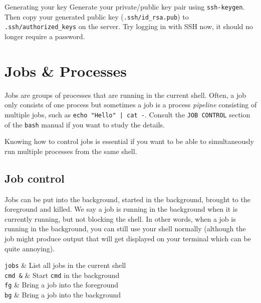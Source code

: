 \documentclass{TheAlternativeCourse}
\begin{document}
\begin{exercisebox}{Generating your key}
    Generate your private/public key pair using \texttt{ssh-keygen}.
    Then copy your generated public key (\texttt{.ssh/id\_rsa.pub}) to
    \texttt{.ssh/authorized\_keys} on the server. Try logging in with SSH now,
    it should no longer require a password.
\end{exercisebox}


\section{Jobs \& Processes}

Jobs are groups of processes that are running in the current shell. Often, a
job only consists of one process but sometimes a job is a process
\emph{pipeline} consisting of multiple jobs, such as
\texttt{echo "Hello" | cat -}. Consult the \texttt{JOB CONTROL} section
of the \texttt{bash} manual if you want to study the details.

Knowing how to control jobs is essential if you want to be able to
simultaneously run multiple processes from the same shell.

\subsection{Job control}

Jobs can be put into the background, started in the background, brought to the
foreground and killed. We say a job is running in the background when it is
currently running, but not blocking the shell. In other words, when a job is
running in the background, you can still use your shell normally (although the
job might produce output that will get displayed on your terminal which can be
quite annoying).

\begin{table}[H]
    \centering
    \begin{tcolorbox}[%
        enhanced,
        fuzzy shadow={1mm}{-1mm}{0mm}{0.1mm}{black!50!white},
        width=1.0\linewidth,
        tabularx={>{\centering\arraybackslash}l|>{\centering\arraybackslash}X},
        title={Working with jobs}]
	    \texttt{jobs} & List all jobs in the current shell\\
	    \texttt{cmd \&} & Start \texttt{cmd} in the background\\
	    \texttt{fg} & Bring a job into the foreground\\
	    \texttt{bg} & Bring a job into the background\\
    \end{tcolorbox}
    \label{tabjobcmds}
\end{table}
\end{document}
